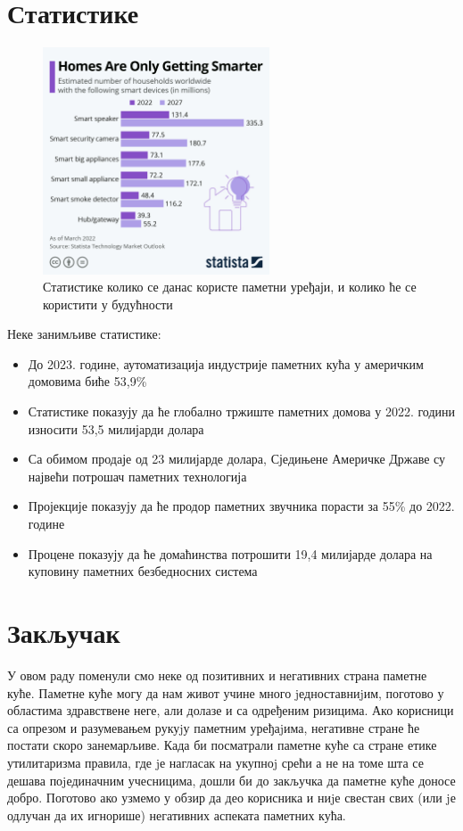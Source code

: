 \documentclass[a4paper]{article}
\begin{document}
\section{Статистике}
\begin{figure}[h!]
    \centering
    \includegraphics[width=0.6\textwidth]{Slike/statistics.png}
    \caption{\label{fig:stat}Статистике колико се данас користе паметни уређаји, и колико ће се користити у будућности}
\end{figure}

Неке занимљиве статистике:
\newline
\begin{itemize}
    \item До 2023. године, аутоматизација индустрије паметних кућа у америчким домовима биће 53,9\%
    \item Статистике показују да ће глобално тржиште паметних домова у 2022. години износити 53,5 милијарди долара
    \item Са обимом продаје од 23 милијарде долара, Сједињене Америчке Државе су највећи потрошач паметних технологија
    \item Пројекције показују да ће продор паметних звучника порасти за 55\% до 2022. године
    \item Процене показују да ће домаћинства потрошити 19,4 милијарде долара на куповину паметних безбедносних система
\end{itemize}

\section{Закључак}
У овом раду поменули смо неке од позитивних и негативних страна паметне куће. Паметне куће могу да нам живот учине много jедноставниjим,
поготово у областима здравствене неге, али долазе и са одређеним ризицима. Ако корисници са опрезом и разумевањем рукуjу паметним уређаjима,
негативне стране ће постати скоро занемарљиве. Када би посматрали паметне куће са стране етике утилитаризма правила, где jе нагласак на
укупноj срећи а не на томе шта се дешава поjединачним учесницима, дошли би до закључка да паметне куће доносе добро. Поготово ако узмемо
у обзир да део корисника и ниjе свестан свих (или jе одлучан да их игнорише) негативних аспеката паметних кућа.
\end{document}
